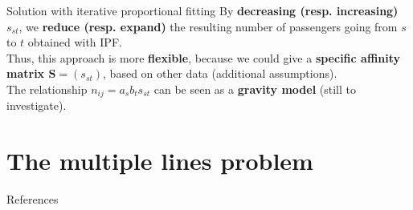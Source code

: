 \documentclass[10pt]{beamer}
\newcommand{\imp}[1]{\textbf{\color{cyan}#1}}
\begin{document}
	
	\begin{frame}{Solution with iterative proportional fitting}
		By \imp{decreasing (resp. increasing) $s_{st}$}, we \imp{reduce (resp. expand)} the resulting number of passengers going from $s$ to $t$ obtained with IPF. \\
		\vspace{0.4cm}
		Thus, this approach is more \imp{flexible}, because we could give a \imp{specific affinity matrix $\mathbf{S} = (s_{st})$}, based on other data (additional assumptions).\\
		\vspace{0.4cm}
		The relationship $n_{ij} = a_s b_t s_{st}$ can be seen as a \imp{gravity model} (still to investigate).
	\end{frame}
		
	
	\section{The multiple lines problem}
	
	
	\begin{frame}[allowframebreaks]{References}
		
		
		
		
	\end{frame}
	
\end{document}
